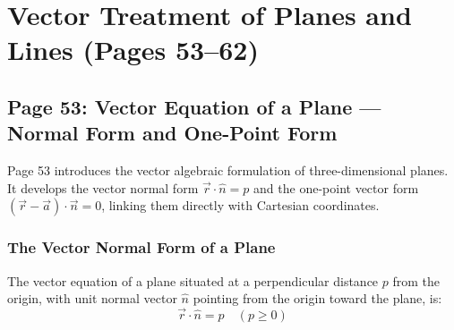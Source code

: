 \chapter{Vector Treatment of Planes and Lines (Pages 53--62)}
\label{ch:vectors}

\section{Page 53: Vector Equation of a Plane --- Normal Form and One-Point Form}
\label{sec:page53}

\begin{conceptbox}
Page 53 introduces the vector algebraic formulation of three-dimensional planes. It develops the vector normal form $\vec{r} \cdot \hat{n} = p$ and the one-point vector form $(\vec{r} - \vec{a}) \cdot \vec{n} = 0$, linking them directly with Cartesian coordinates.
\end{conceptbox}

\subsection{The Vector Normal Form of a Plane}
\begin{theorembox}
The vector equation of a plane situated at a perpendicular distance $p$ from the origin, with unit normal vector $\hat{n}$ pointing from the origin toward the plane, is:
\begin{equation}
    \boxed{\vec{r} \cdot \hat{n} = p} \quad (p \ge 0)
\end{equation}
\end{theorembox}

